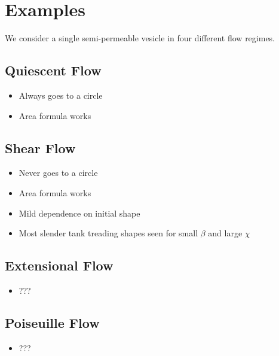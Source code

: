 \documentclass[aps,prl,showpacs]{revtex4}
\begin{document}
\section{Examples}
We consider a single semi-permeable vesicle in four different flow
regimes.

\subsection{Quiescent Flow}
\begin{itemize}
  \item Always goes to a circle
  \item Area formula works
\end{itemize}

\subsection{Shear Flow}
\begin{itemize}
  \item Never goes to a circle
  \item Area formula works
  \item Mild dependence on initial shape
  \item Most slender tank treading shapes seen for small $\beta$ and
    large $\chi$
\end{itemize}

%

\subsection{Extensional Flow}
\begin{itemize}
  \item ???
\end{itemize}

\subsection{Poiseuille Flow}
\begin{itemize}
  \item ???
\end{itemize}
\end{document}
